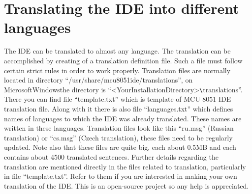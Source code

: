 \documentclass[a4paper,twoside,12pt]{book}
\begin{document}
\chapter{Translating the IDE into different languages}
	The IDE can be translated to almost any language. The translation can be accomplished by creating of a translation definition file. Such a file must follow certain strict rules in order to work properly. Translation files are normally located in directory ``/usr/share/mcu8051ide/translations'', on Microsoft\textregistered Windows\textregistered the directory is ``<YourInstallationDirectory>\verb'\'translations''. There you can find file ``template.txt'' which is template of MCU 8051 IDE translation file. Along with it there is also file ``languages.txt'' which defines names of languages to which the IDE was already translated. These names are written in these languages. Translation files look like this ``ru.msg'' (Russian translation) or ``cs.msg'' (Czech translation), these files need to be regularly updated. Note also that these files are quite big, each about 0.5MB and each contains about 4500 translated sentences. Further details regarding the translation are mentioned directly in the files related to
translation, particularly in file ``template.txt''. Refer to them if you are interested in making your own translation of the IDE. This is an open-source project so any help is appreciated.
\end{document}
